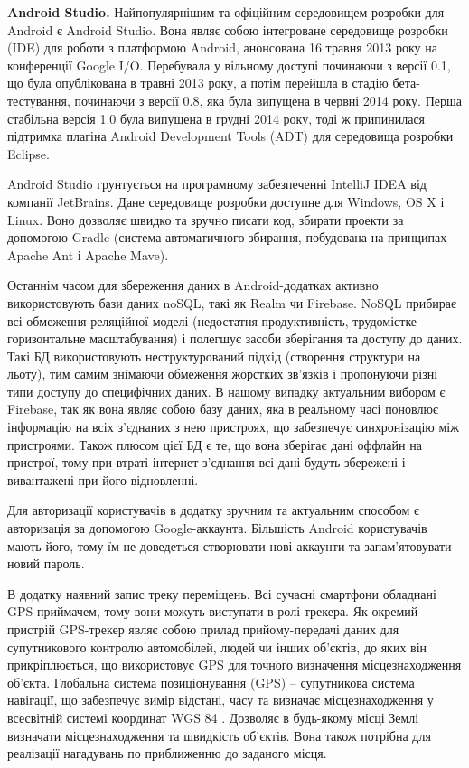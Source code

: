 \documentclass[../main.tex]{subfiles}
\begin{document}
{\bfseries{Android Studio.}}
Найпопулярнішим та офіційним середовищем розробки для Android є Android Studio. Вона являє собою інтегроване середовище розробки (IDE) для роботи з платформою Android, анонсована 16 травня 2013 року на конференції Google I/O. Перебувала у вільному доступі починаючи з версії 0.1, що була опублікована в травні 2013 року, а потім перейшла в стадію бета-тестування, починаючи з версії 0.8, яка була випущена в червні 2014 року. Перша стабільна версія 1.0 була випущена в грудні 2014 року, тоді ж припинилася підтримка плагіна Android Development Tools (ADT) для середовища розробки Eclipse.

Android Studio грунтується на програмному забезпеченні IntelliJ IDEA від компанії JetBrains. Дане середовище розробки доступне для Windows, OS X і Linux. Воно дозволяє швидко та зручно писати код, збирати проекти за допомогою Gradle (система автоматичного збирання, побудована на принципах Apache Ant і Apache Mave).

Останнім часом для збереження даних в Android-додатках активно використовують бази даних noSQL, такі як Realm чи Firebase. NoSQL прибирає всі обмеження реляційної моделі (недостатня продуктивність, трудомістке горизонтальне масштабування) і полегшує засоби зберігання та доступу до даних. Такі БД використовують неструктурований підхід (створення структури на льоту), тим самим знімаючи обмеження жорстких зв'язків і пропонуючи різні типи доступу до специфічних даних. В нашому випадку актуальним вибором є Firebase, так як вона являє собою базу даних, яка в реальному часі поновлює інформацію на всіх з'єднаних з нею пристроях, що забезпечує синхронізацію між пристроями. Також плюсом цієї БД є те, що вона зберігає дані оффлайн на пристрої, тому при втраті інтернет з'єднання всі дані будуть збережені і вивантажені при його відновленні.

Для авторизації користувачів в додатку зручним та актуальним способом є авторизація за допомогою Google-аккаунта. Більшість Android користувачів мають його, тому їм не доведеться створювати нові аккаунти та запам'ятовувати новий пароль.

В додатку наявний запис треку переміщень. Всі сучасні смартфони обладнані GPS-приймачем, тому вони можуть виступати в ролі трекера.  Як окремий пристрій GPS-трекер являє собою прилад прийому-передачі даних для супутникового контролю автомобілей, людей чи інших об'єктів, до яких він прикріплюється, що використовує GPS для точного визначення місцезнаходження об'єкта. Глобальна система позиціонування (GPS) – супутникова система навігації, що забезпечує вимір відстані, часу та визначає місцезнаходження у всесвітній системі координат WGS 84 \cite{gps}. Дозволяє в будь-якому місці Землі визначати місцезнаходження та швидкість об'єктів. Вона також потрібна для реалізації нагадувань по приближенню до заданого місця.
\end{document}
